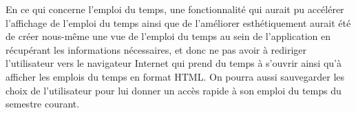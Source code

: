 En ce qui concerne l’emploi du temps, une fonctionnalité qui aurait pu accélérer l’affichage de l’emploi du temps ainsi que de l’améliorer esthétiquement aurait été de créer nous-même une vue de l’emploi du temps au sein de l’application en récupérant les informations nécessaires, et donc ne pas avoir à rediriger l’utilisateur vers le navigateur Internet qui prend du temps à s’ouvrir ainsi qu’à afficher les emplois du temps en format HTML. On pourra aussi sauvegarder les choix de l'utilisateur pour lui donner un accès rapide à son emploi du temps du semestre courant.\\